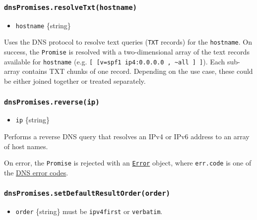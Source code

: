 \subsubsection{\texorpdfstring{\texttt{dnsPromises.resolveTxt(hostname)}}{dnsPromises.resolveTxt(hostname)}}\label{dnspromises.resolvetxthostname}

\begin{itemize}
\tightlist
\item
  \texttt{hostname} \{string\}
\end{itemize}

Uses the DNS protocol to resolve text queries (\texttt{TXT} records) for
the \texttt{hostname}. On success, the \texttt{Promise} is resolved with
a two-dimensional array of the text records available for
\texttt{hostname} (e.g.
\texttt{{[}\ {[}\textquotesingle{}v=spf1\ ip4:0.0.0.0\ \textquotesingle{},\ \textquotesingle{}\textasciitilde{}all\textquotesingle{}\ {]}\ {]}}).
Each sub-array contains TXT chunks of one record. Depending on the use
case, these could be either joined together or treated separately.

\subsubsection{\texorpdfstring{\texttt{dnsPromises.reverse(ip)}}{dnsPromises.reverse(ip)}}\label{dnspromises.reverseip}

\begin{itemize}
\tightlist
\item
  \texttt{ip} \{string\}
\end{itemize}

Performs a reverse DNS query that resolves an IPv4 or IPv6 address to an
array of host names.

On error, the \texttt{Promise} is rejected with an
\href{errors.md\#class-error}{\texttt{Error}} object, where
\texttt{err.code} is one of the \hyperref[error-codes]{DNS error codes}.

\subsubsection{\texorpdfstring{\texttt{dnsPromises.setDefaultResultOrder(order)}}{dnsPromises.setDefaultResultOrder(order)}}\label{dnspromises.setdefaultresultorderorder}

\begin{itemize}
\tightlist
\item
  \texttt{order} \{string\} must be
  \texttt{\textquotesingle{}ipv4first\textquotesingle{}} or
  \texttt{\textquotesingle{}verbatim\textquotesingle{}}.
\end{itemize}

